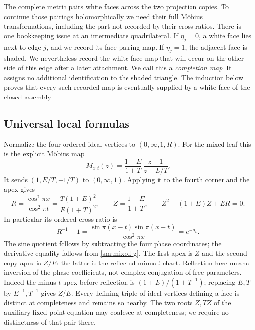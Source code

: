 The complete metric pairs white faces across the two projection
copies. To continue those pairings holomorphically we need their full
Möbius transformations, including the part not recorded by their
cross ratios. There is one bookkeeping issue at an intermediate
quadrilateral. If $\eta_j=0$, a white face lies next to edge $j$, and
we record its face-pairing map. If $\eta_j=1$, the adjacent face is
shaded. We nevertheless record the white-face map that will occur on
the other side of this edge after a later attachment. We call this a
\emph{completion map}. It assigns no additional identification to the
shaded triangle. The induction below proves that every such recorded
map is eventually supplied by a white face of the closed assembly.

\subsection{Universal local formulas}
Normalize the four ordered ideal vertices to $(0,\infty,1,R)$.
For the mixed leaf this is the explicit Möbius map
\[
 M_{x,t}(z)=
 \frac{1+E}{1+T}\,\frac{z-1}{z-E/T}.
\]
It sends $(1,E/T,-1/T)$ to $(0,\infty,1)$.
Applying it to the fourth corner and the apex gives
\begin{equation}\label{sm:flags}
 R=\frac{\cos^2\pi x}{\cos^2\pi t}
   =\frac{T(1+E)^2}{E(1+T)^2},\qquad
 Z=\frac{1+E}{1+T},\qquad
 Z^2-(1+E)Z+ER=0.
\end{equation}
In particular its ordered cross ratio is
\[
 R^{-1}-1=
 \frac{\sin\pi(x-t)\sin\pi(x+t)}{\cos^2\pi x}=e^{-g_x}.
\]
The sine quotient follows by subtracting the four phase coordinates;
the derivative equality follows from \eqref{sm:mixed-g}.
The first apex is $Z$ and the second-copy apex is $Z/E$:
the latter is the reflected minus-$t$ chart.
Reflection here means inversion of the phase coefficients, not
complex conjugation of free parameters. Indeed the minus-$t$
apex before reflection is $(1+E)/(1+T^{-1})$; replacing
$E,T$ by $E^{-1},T^{-1}$ gives $Z/E$.
Every defining triple of
ideal vertices defining a face is distinct at completeness and remains so nearby.
The two roots $Z,TZ$ of the auxiliary fixed-point equation may
coalesce at completeness; we require no distinctness of that pair
there.

